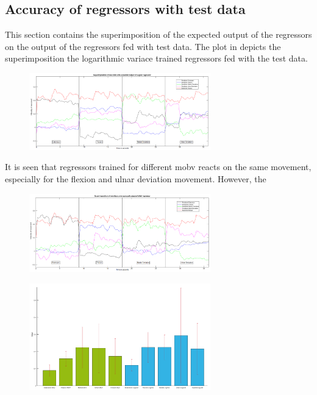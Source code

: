 \subsection{Accuracy of regressors with test data}
This section contains the superimposition of the expected output of the regressors on the output of the regressors fed with test data. The plot in  depicts the superimposition the logarithmic variace trained regressors fed with the test data.

\begin{figure}[H]
	\includegraphics[width=0.7\textwidth]{figures/results/SuperPoisonLogVarNewData}  %
	\caption{}
	\label{fig:SuperPoisonLogVarNewData}  %
\end{figure}

It is seen that regressors trained for different mobv reacts on the same movement, especially for the flexion and ulnar deviation movement. However, the 

\begin{figure}[H]
	\includegraphics[width=0.7\textwidth]{figures/results/SuperPoisonMavNewData}  %
	\caption{}
	\label{fig:SuperPoisonMavNewData}  %
\end{figure}


\begin{figure}[H]
	\includegraphics[width=0.7\textwidth]{figures/results/RMSEBarPlotNewData}  %
	\caption{}
	\label{fig:RMSEBarPlotNewData}  %
\end{figure}
